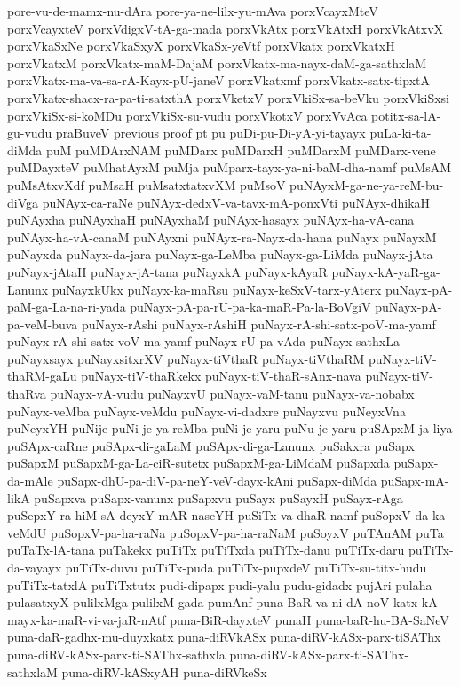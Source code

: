 {pore-vu-de-mamx-nu-dAra
pore-ya-ne-lilx-yu-mAva
porxVcayxMteV
porxVcayxteV
porxVdigxV-tA-ga-mada
porxVkAtx
porxVkAtxH
porxVkAtxvX
porxVkaSxNe
porxVkaSxyX
porxVkaSx-yeVtf
porxVkatx
porxVkatxH
porxVkatxM
porxVkatx-maM-DajaM
porxVkatx-ma-nayx-daM-ga-sathxlaM
porxVkatx-ma-va-sa-rA-Kayx-pU-janeV
porxVkatxmf
porxVkatx-satx-tipxtA
porxVkatx-shacx-ra-pa-ti-satxthA
porxVketxV
porxVkiSx-sa-beVku
porxVkiSxsi
porxVkiSx-si-koMDu
porxVkiSx-su-vudu
porxVkotxV
porxVvAca
potitx-sa-lA-gu-vudu
praBuveV
previous
proof
pt
pu
puDi-pu-Di-yA-yi-tayayx
puLa-ki-ta-diMda
puM
puMDArxNAM
puMDarx
puMDarxH
puMDarxM
puMDarx-vene
puMDayxteV
puMhatAyxM
puMja
puMparx-tayx-ya-ni-baM-dha-namf
puMsAM
puMsAtxvXdf
puMsaH
puMsatxtatxvXM
puMsoV
puNAyxM-ga-ne-ya-reM-bu-diVga
puNAyx-ca-raNe
puNAyx-dedxV-va-tavx-mA-ponxVti
puNAyx-dhikaH
puNAyxha
puNAyxhaH
puNAyxhaM
puNAyx-hasayx
puNAyx-ha-vA-cana
puNAyx-ha-vA-canaM
puNAyxni
puNAyx-ra-Nayx-da-hana
puNayx
puNayxM
puNayxda
puNayx-da-jara
puNayx-ga-LeMba
puNayx-ga-LiMda
puNayx-jAta
puNayx-jAtaH
puNayx-jA-tana
puNayxkA
puNayx-kAyaR
puNayx-kA-yaR-ga-Lanunx
puNayxkUkx
puNayx-ka-maRsu
puNayx-keSxV-tarx-yAterx
puNayx-pA-paM-ga-La-na-ri-yada
puNayx-pA-pa-rU-pa-ka-maR-Pa-la-BoVgiV
puNayx-pA-pa-veM-buva
puNayx-rAshi
puNayx-rAshiH
puNayx-rA-shi-satx-poV-ma-yamf
puNayx-rA-shi-satx-voV-ma-yamf
puNayx-rU-pa-vAda
puNayx-sathxLa
puNayxsayx
puNayxsitxrXV
puNayx-tiVthaR
puNayx-tiVthaRM
puNayx-tiV-thaRM-gaLu
puNayx-tiV-thaRkekx
puNayx-tiV-thaR-sAnx-nava
puNayx-tiV-thaRva
puNayx-vA-vudu
puNayxvU
puNayx-vaM-tanu
puNayx-va-nobabx
puNayx-veMba
puNayx-veMdu
puNayx-vi-dadxre
puNayxvu
puNeyxVna
puNeyxYH
puNije
puNi-je-ya-reMba
puNi-je-yaru
puNu-je-yaru
puSApxM-ja-liya
puSApx-caRne
puSApx-di-gaLaM
puSApx-di-ga-Lanunx
puSakxra
puSapx
puSapxM
puSapxM-ga-La-ciR-sutetx
puSapxM-ga-LiMdaM
puSapxda
puSapx-da-mAle
puSapx-dhU-pa-diV-pa-neY-veV-dayx-kAni
puSapx-diMda
puSapx-mA-likA
puSapxva
puSapx-vanunx
puSapxvu
puSayx
puSayxH
puSayx-rAga
puSepxY-ra-hiM-sA-deyxY-mAR-naseYH
puSiTx-va-dhaR-namf
puSopxV-da-ka-veMdU
puSopxV-pa-ha-raNa
puSopxV-pa-ha-raNaM
puSoyxV
puTAnAM
puTa
puTaTx-lA-tana
puTakekx
puTiTx
puTiTxda
puTiTx-danu
puTiTx-daru
puTiTx-da-vayayx
puTiTx-duvu
puTiTx-puda
puTiTx-pupxdeV
puTiTx-su-titx-hudu
puTiTx-tatxlA
puTiTxtutx
pudi-dipapx
pudi-yalu
pudu-gidadx
pujAri
pulaha
pulasatxyX
pulilxMga
pulilxM-gada
pumAnf
puna-BaR-va-ni-dA-noV-katx-kA-mayx-ka-maR-vi-va-jaR-nAtf
puna-BiR-dayxteV
punaH
puna-baR-hu-BA-SaNeV
puna-daR-gadhx-mu-duyxkatx
puna-diRVkASx
puna-diRV-kASx-parx-tiSAThx
puna-diRV-kASx-parx-ti-SAThx-sathxla
puna-diRV-kASx-parx-ti-SAThx-sathxlaM
puna-diRV-kASxyAH
puna-diRVkeSx
}
